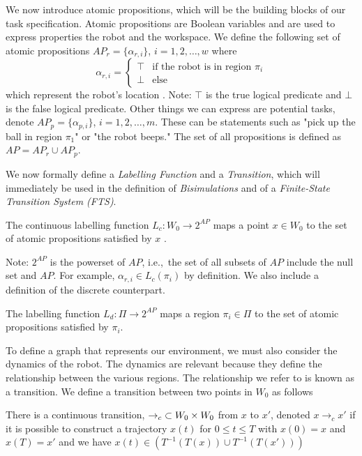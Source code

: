 We now introduce atomic propositions, which will be the building blocks of our task specification. Atomic propositions are Boolean variables and are used to express properties the robot and the workspace. We define the following set of atomic propositions $AP_r = \{\alpha_{r,i}\}$, $i=1,2,\dots,w$ where 
\[\alpha_{r,i} =  \begin{cases}
\top & \text{if the robot is in region $\pi_i$} \\
\bot & \text{else}
\end{cases}
\]
which represent the robot's location \cite{guo15}. Note: $\top$ is the true logical predicate and $\bot$ is the false logical predicate. Other things we can express are potential tasks, denote $AP_p = \{\alpha_{p,i}\}$, $i=1,2,\dots,m$. These can be statements such as "pick up the ball in region $\pi_1$" or "the robot beeps." The set of all propositions is defined as $AP = AP_r \cup AP_p$.

We now formally define a \textit{Labelling Function} and a \textit{Transition}, which will immediately be used in the definition of \textit{Bisimulations} and of a \textit{Finite-State Transition System (FTS)}. 
\theoremstyle{definition}
\begin{definition}
\label{defCLF}
The continuous labelling function $L_c:W_0 \rightarrow 2^{AP}$ maps a point $x \in W_0$ to the set of atomic propositions satisfied by $x$ \cite{guo15}.
\end{definition} 
Note: $2^{AP}$ is the powerset of $AP$, i.e.,\ the set of all subsets of $AP$ include the null set and $AP$. For example, $\alpha_{r,i} \in L_c(\pi_i)$ by definition. 
We also include a definition of the discrete counterpart. 

\theoremstyle{definition}
\begin{definition}
\label{defDLF}
The labelling function $L_d:\Pi\rightarrow 2^{AP}$ maps a region $\pi_i \in \Pi$ to the set of atomic propositions satisfied by $\pi_i$.
\end{definition} 


To define a graph that represents our environment, we must also consider the dynamics of the robot. The dynamics are relevant because they define the relationship between the various regions. The relationship we refer to is known as a transition. We define a transition between two points in $W_0$ as follows
\theoremstyle{definition}
\begin{definition}
\label{defCTransition}
There is a continuous transition, $\rightarrow_c \hspace{0.1cm} \subset W_0 \times W_0$ from $x$ to $x'$, denoted $x \rightarrow_c x'$ if it is possible to construct a trajectory $x(t)$ for $0 \leq t \leq T$ with $x(0)=x$ and $x(T) =x'$ and we have $x(t) \in (T^{-1}(T(x))\cup T^{-1}(T(x')))$ \cite{fainekos09}
\end{definition}


